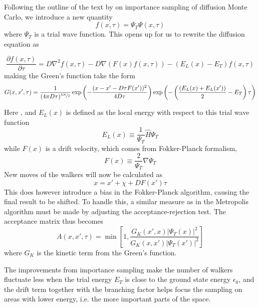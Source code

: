 \documentclass[aps,prb,twocolumn,floatfix]{revtex4}
\begin{document}
Following the outline of the text by \textcite{lecturenotes} on importance sampling of diffusion Monte Carlo, we introduce a new quantity
\begin{equation}
    f(x,\tau) = \Psi_T \Psi(x,\tau)
\end{equation} 
where $\Psi_T$ is a trial wave function. This opens up for us to rewrite the diffusion equation as
\begin{widetext}
    \begin{equation}
            \frac{\partial f(x,\tau)}{\partial \tau} = D\nabla^2 f(x,\tau) - D\nabla(F(x)f(x,\tau)) - (E_L(x) - E_T)f(x,\tau)
    \end{equation} 
    making the Green's function take the form
    \begin{equation}
        G(x,x',\tau) = \frac{1}{(4\pi D \tau)^{\nicefrac{3N}{2}}} \exp \left(- \frac{(x-x'-D \tau F(x'))^2}{4D\tau} \right) \exp \left( - \left(\frac{(E_L(x) + E_L(x'))}{2} - E_T \right) \tau \right)
    \end{equation} 
\end{widetext}
Here , and $E_L(x)$ is defined as the local energy with respect to this trial wave function
\begin{equation}
    E_L(x) \equiv \frac{1}{\Psi_T} \hat H \Psi_T
\end{equation} 
while $F(x)$ is a drift velocity, which comes from Fokker-Planck formalism,
\begin{equation}
    F(x) \equiv \frac{2}{\Psi_T} \nabla \Psi_T
\end{equation}
New moves of the walkers will now be calculated as
\begin{equation}
    x = x' + \chi + DF(x')\tau
\end{equation} 
This does however introduce a bias in the Fokker-Planck algorithm, causing the final result to be shifted. To handle this, a similar measure as in the Metropolis algorithm must be made by adjusting the acceptance-rejection test. The acceptance matrix thus becomes
\begin{equation}
    A(x,x',\tau) = \min \left [ 1, \frac{G_K(x',x) |\Psi_T(x)|^2}{G_K(x,x')|\Psi_T(x')|^2} \right ]
\end{equation} 
where $G_K$ is the kinetic term from the Green's function.

The improvements from importance sampling make the number of walkers fluctuate less when the trial energy $E_T$ is close to the ground state energy $\epsilon_0$, and the drift term together with the branching factor helps focus the sampling on areas with lower energy, i.e. the more important parts of the space.
\end{document}
